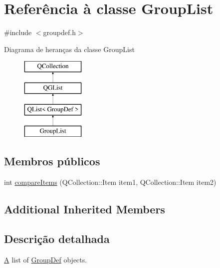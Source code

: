 \hypertarget{class_group_list}{\section{Referência à classe Group\-List}
\label{class_group_list}
}


{\ttfamily \#include $<$groupdef.\-h$>$}

Diagrama de heranças da classe Group\-List\begin{figure}[H]
\begin{center}
\leavevmode
\includegraphics[height=4.000000cm]{class_group_list}
\end{center}
\end{figure}
\subsection*{Membros públicos}
\begin{DoxyCompactItemize}
\item 
int \hyperlink{class_group_list_a219450accf048597ffc7113ecde4c402}{compare\-Items} (Q\-Collection\-::\-Item item1, Q\-Collection\-::\-Item item2)
\end{DoxyCompactItemize}
\subsection*{Additional Inherited Members}


\subsection{Descrição detalhada}
\hyperlink{class_a}{A} list of \hyperlink{class_group_def}{Group\-Def} objects. 

